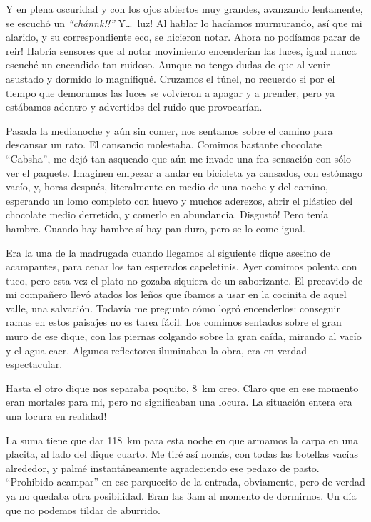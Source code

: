 Y en plena oscuridad y con los ojos abiertos muy grandes, avanzando lentamente,
se escuch\'o un \emph{``\textexclamdown \textexclamdown ch\'annk!!''} Y\ldots\
\textexclamdown luz! Al hablar lo hac\'iamos murmurando, as\'i que mi alarido,
y su correspondiente eco, se hicieron notar. \textexclamdown Ahora no pod\'iamos
parar de reir! Habr\'ia sensores que al notar movimiento encender\'ian las
luces, igual nunca escuch\'e un encendido tan ruidoso. Aunque no tengo dudas de
que al venir asustado y dormido lo magnifiqu\'e. Cruzamos el t\'unel, no
recuerdo si por el tiempo que demoramos las luces se volvieron a apagar y a
prender, pero ya est\'abamos adentro y advertidos del ruido que provocar\'ian.

Pasada la medianoche y a\'un sin comer, nos sentamos sobre el camino para
descansar un rato. El cansancio molestaba. Comimos bastante chocolate
``Cabsha'', me dej\'o tan asqueado que a\'un me invade una fea sensaci\'on con
s\'olo ver el paquete. Imaginen empezar a andar en bicicleta ya cansados, con
est\'omago vac\'io, y, horas despu\'es, literalmente en medio de una noche y
del camino, esperando un lomo completo con huevo y muchos aderezos, abrir el
pl\'astico del chocolate medio derretido, y comerlo en abundancia.
\textexclamdown Disgust\'o! Pero ten\'ia hambre. Cuando hay hambre s\'i hay pan
duro, pero se lo come igual.

Era la una de la madrugada cuando llegamos al siguiente dique asesino de
acampantes, para cenar los tan esperados capeletinis. Ayer comimos polenta con
tuco, pero esta vez el plato no gozaba siquiera de un saborizante. El precavido
de mi compa\~nero llev\'o atados los le\~nos que \'ibamos a usar en la cocinita
de aquel valle, una salvaci\'on. Todav\'ia me pregunto c\'omo logr\'o
encenderlos: conseguir ramas en estos paisajes no es tarea f\'acil. Los comimos
sentados sobre el gran muro de ese dique, con las piernas colgando sobre la gran
ca\'ida, mirando al vac\'io y el agua caer. Algunos reflectores iluminaban la
obra, era en verdad espectacular.

Hasta el otro dique nos separaba poquito, 8~km creo. Claro que en ese momento
eran mortales para mi, pero no significaban una locura. \textexclamdown La
situaci\'on entera era una locura en realidad!

La suma tiene que dar 118~km para esta noche en que armamos la carpa en una
placita, al lado del dique cuarto. Me tir\'e as\'i nom\'as, con todas las
botellas vac\'ias alrededor, y palm\'e instant\'aneamente agradeciendo ese
pedazo de pasto. ``Prohibido acampar'' en ese parquecito de la entrada,
obviamente, pero de verdad ya no quedaba otra posibilidad. Eran las 3am al
momento de dormirnos. Un d\'ia que no podemos tildar de aburrido.

